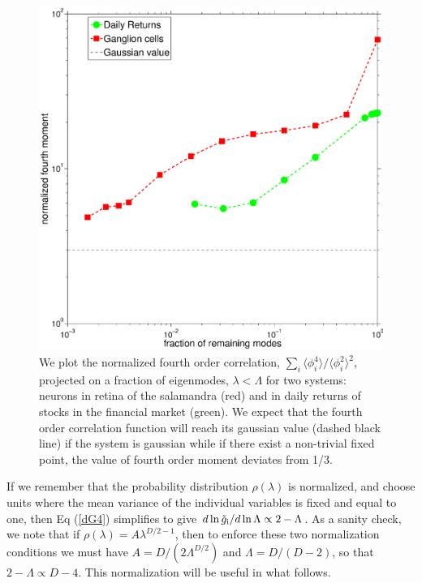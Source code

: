 \documentclass[aps,twocolumn,floats,nofootinbib,prl]{revtex4}
\begin{document}
\begin{figure}
\includegraphics[width=.45\textwidth]{fig2.eps}
\caption{We plot the normalized fourth order correlation, $\sum_i \langle \phi_i^4\rangle/\langle \phi_i^2\rangle^2$, projected on a fraction of eigenmodes, $\lambda<\Lambda$ for two systems: neurons in retina of the salamandra (red) and in daily returns of stocks in the financial market (green). We expect that the fourth order correlation function will reach its gaussian value (dashed black line) if the system is gaussian while if there exist a non-trivial fixed point, the value of fourth order moment deviates from 1/3.}
\label{fig:4th}
\end{figure}

If we remember that the probability distribution $\rho(\lambda )$ is normalized, and choose units where the mean variance of the individual variables is fixed and equal to one, then Eq (\ref{dG4}) simplifies to give ${d\ln \tilde g_{\rm i} }/{d\ln\Lambda} \propto 2-\Lambda$.  As a sanity check, we note that if $\rho(\lambda ) = A  \lambda^{{D/2}-1} $, then to enforce these two normalization conditions we must have $A = D/(2\Lambda^{D/2})$ and $\Lambda = D/(D-2)$, so that $2-\Lambda \propto D-4$. This normalization will be useful in what follows.


\end{document}
